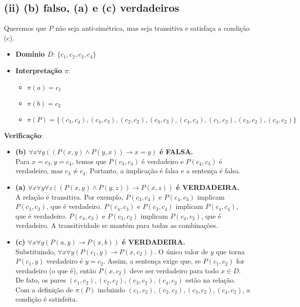 \documentclass{article}
\begin{document}
\subsection*{(ii) (b) falso, (a) e (c) verdadeiros}
Queremos que $P$ não seja anti-simétrica, mas seja transitiva e satisfaça a condição (c).

\begin{itemize}
    \item \textbf{Domínio $D$}: $\{c_1, c_2, c_3, c_4\}$
    \item \textbf{Interpretação $\pi$}:
    \begin{itemize}
        \item $\pi(a) = c_1$
        \item $\pi(b) = c_2$
        \item $\pi(P) = \{(c_3, c_4), (c_4, c_3), (c_2, c_2), (c_3, c_3), (c_4, c_4), (c_1, c_2), (c_3, c_2), (c_4, c_2)\}$
    \end{itemize}
\end{itemize}

\textbf{Verificação}:
\begin{itemize}
    \item \textbf{(b) $\forall x\forall y((P(x,y)\wedge P(y,x))\rightarrow x=y)$ é FALSA.} \\
    Para $x=c_3, y=c_4$, temos que $P(c_3,c_4)$ é verdadeiro e $P(c_4,c_3)$ é verdadeiro, mas $c_3 \neq c_4$. Portanto, a implicação é falsa e a sentença é falsa.

    \item \textbf{(a) $\forall x\forall y\forall z((P(x,y)\wedge P(y,z))\rightarrow P(x,z))$ é VERDADEIRA.} \\
    A relação é transitiva. Por exemplo, $P(c_3,c_4)$ e $P(c_4,c_3)$ implicam $P(c_3,c_3)$, que é verdadeiro. $P(c_4,c_3)$ e $P(c_3,c_4)$ implicam $P(c_4,c_4)$, que é verdadeiro. $P(c_4,c_3)$ e $P(c_3,c_2)$ implicam $P(c_4,c_2)$, que é verdadeiro. A transitividade se mantém para todas as combinações.

    \item \textbf{(c) $\forall x\forall y(P(a,y)\rightarrow P(x,b))$ é VERDADEIRA.} \\
    Substituindo, $\forall x\forall y(P(c_1,y)\rightarrow P(x,c_2))$. O único valor de $y$ que torna $P(c_1,y)$ verdadeiro é $y=c_2$. Assim, a sentença exige que, se $P(c_1,c_2)$ for verdadeiro (o que é), então $P(x,c_2)$ deve ser verdadeiro para todo $x \in D$. De fato, os pares $(c_1, c_2), (c_2, c_2), (c_3, c_2), (c_4, c_2)$ estão na relação. Com a definição de $\pi(P)$ incluindo $(c_1, c_2), (c_2, c_2), (c_3, c_2), (c_4, c_2)$, a condição é satisfeita.
\end{itemize}
\end{document}
